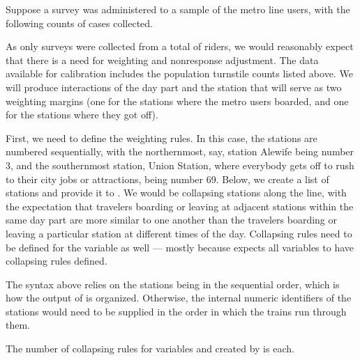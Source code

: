 Suppose a survey was administered to a sample of the metro line users, with the following counts
of cases collected.



\noindent
\begin{stlog}
\nullskip
\end{stlog}


As only \nullskip surveys were collected from a total of
\nullskip riders, we would reasonably expect that there is a need
for weighting and nonresponse adjustment.
The data available for calibration includes the population turnstile counts
listed above. We will produce interactions of the day part and the station that will serve as two
weighting margins (one for the stations where the metro users boarded, and one for the stations
where they got off).

First, we need to define the weighting rules. In this case, the stations are numbered sequentially,
with the northernmost, say, station Alewife being number 3, and the southernmost station,
Union Station, where everybody gets off to rush to their city jobs or attractions, being number 69.
Below, we create a list of stations and provide it to .
We would be collapsing stations along the line, with the expectation that travelers boarding or leaving
at adjacent stations within the same day part are more similar to one another than the travelers
boarding or leaving a particular station at different times of the day. Collapsing rules
need to be defined for the  variable as well --- mostly because 
expects all variables to have collapsing rules defined.

\begin{stlog}
\nullskip
\end{stlog}

The syntax above relies on the stations being in the sequential order, which is how
the output of  is organized. Otherwise, the internal numeric identifiers of the stations
would need to be supplied in the order in which the trains run through them.

The number of collapsing rules for variables  and 
created by 
is \nullskip each.

